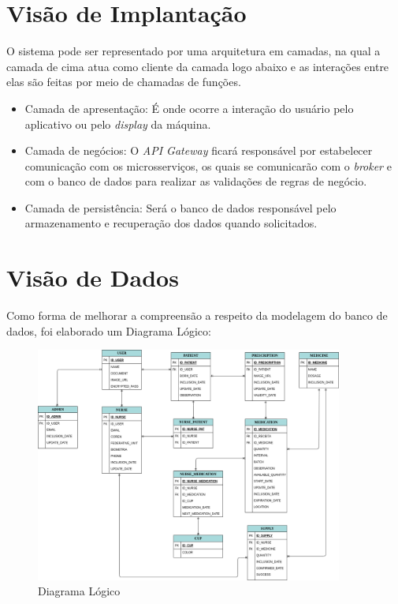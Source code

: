 \begin{apendicesenv}

\section{Visão de Implantação}

O sistema pode ser representado por uma arquitetura em camadas, na qual a camada de cima atua como cliente da camada logo abaixo e as interações entre elas são
feitas por meio de chamadas de funções.


\begin{itemize}
    \item Camada de apresentação: É onde ocorre a interação do usuário pelo aplicativo ou pelo \textit{display} da máquina.
    \item Camada de negócios: O \textit{API Gateway} ficará responsável por  estabelecer comunicação com os microsserviços, os quais se comunicarão com o \emph{broker} e com o banco de dados para realizar as validações de regras de negócio.
    \item Camada de persistência: Será o banco de dados responsável pelo armazenamento e recuperação dos dados quando solicitados.
\end{itemize}

\section{Visão de Dados}

Como forma de melhorar a compreensão a respeito da modelagem do banco de dados, foi elaborado um Diagrama Lógico:

\begin{figure}[H]
    \centering
    \includegraphics[width=0.9\textwidth]{figuras/software/database.png}
    \caption{Diagrama Lógico}
    \label{fig:der_apdc}
\end{figure}


\end{apendicesenv}
